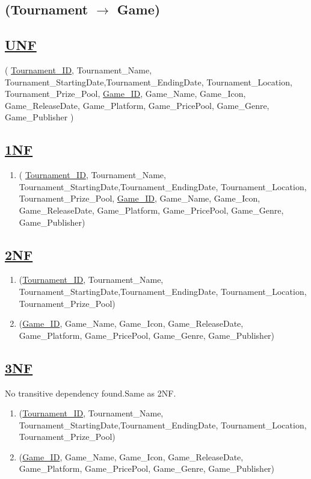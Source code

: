 \subsection{\texorpdfstring{\centering (Tournament $\rightarrow$ Game)}{ (Tournament-Game)}}

\subsection*{\underline{UNF}}

(
\underline{Tournament\_ID}, Tournament\_Name, Tournament\_StartingDate,Tournament\_EndingDate, Tournament\_Location, Tournament\_Prize\_Pool,
\underline{Game\_ID}, Game\_Name, Game\_Icon, Game\_ReleaseDate, Game\_Platform, Game\_PricePool, Game\_Genre, Game\_Publisher
)


\subsection*{\underline{1NF}}
\begin{enumerate}
    \item (
          \underline{Tournament\_ID}, Tournament\_Name, Tournament\_StartingDate,Tournament\_EndingDate, Tournament\_Location, Tournament\_Prize\_Pool,
          \underline{Game\_ID}, Game\_Name, Game\_Icon, Game\_ReleaseDate, Game\_Platform, Game\_PricePool, Game\_Genre, Game\_Publisher)
\end{enumerate}


\subsection*{\underline{2NF}}
\begin{enumerate}
    \item (\underline{Tournament\_ID}, Tournament\_Name, Tournament\_StartingDate,Tournament\_EndingDate, Tournament\_Location, Tournament\_Prize\_Pool)
    \item (\underline{Game\_ID}, Game\_Name, Game\_Icon, Game\_ReleaseDate, Game\_Platform, Game\_PricePool, Game\_Genre, Game\_Publisher)
\end{enumerate}

\subsection*{\underline{3NF}}
No transitive dependency found.Same as 2NF.
\begin{enumerate}
    \item (\underline{Tournament\_ID}, Tournament\_Name, Tournament\_StartingDate,Tournament\_EndingDate, Tournament\_Location, Tournament\_Prize\_Pool)
    \item (\underline{Game\_ID}, Game\_Name, Game\_Icon, Game\_ReleaseDate, Game\_Platform, Game\_PricePool, Game\_Genre, Game\_Publisher)
\end{enumerate}

